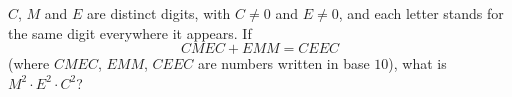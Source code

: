 $C$, $M$ and $E$ are distinct digits, with $C\ne0$ and $E\ne0$, and each letter stands for the same digit everywhere it appears. If
\[
CMEC+EMM=CEEC
\]
(where $CMEC$, $EMM$, $CEEC$ are numbers written in base $10$), what is $M^2\cdot E^2\cdot C^2$?
